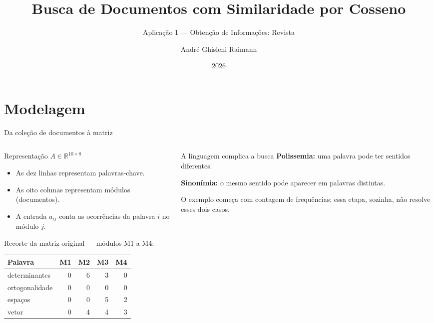 \documentclass{beamer}
\title[Busca por Cosseno]{Busca de Documentos com Similaridade por Cosseno}
\subtitle{Aplicação 1 — Obtenção de Informações: Revista}
\author[André Ghisleni Raimann]{André Ghisleni Raimann}
\institute[Álgebra Linear]{Álgebra Linear}
\date{2026}
\begin{document}
\begin{frame}
  \titlepage
\end{frame}

\section{Modelagem}

\begin{frame}{Da coleção de documentos à matriz}
  \begin{columns}[T]
    \begin{column}{0.55\textwidth}
      \begin{block}{Representação}
        \centering
        $A\in\mathbb{R}^{10\times 8}$
      \end{block}
      \begin{itemize}
        \item As dez linhas representam palavras-chave.
        \item As oito colunas representam módulos (documentos).
        \item A entrada $a_{ij}$ conta as ocorrências da palavra $i$ no módulo $j$.
      \end{itemize}
      \vspace{0.1cm}
      \small Recorte da matriz original — módulos M1 a M4:
      \begin{center}
        \scriptsize
        \begin{tabular}{lrrrr}
          \toprule
          Palavra & M1 & M2 & M3 & M4 \\
          \midrule
          determinantes & 0 & 6 & 3 & 0 \\
          ortogonalidade & 0 & 0 & 0 & 0 \\
          espaços & 0 & 0 & 5 & 2 \\
          vetor & 0 & 4 & 4 & 3 \\
          \bottomrule
        \end{tabular}
      \end{center}
    \end{column}
    \begin{column}{0.41\textwidth}
      \begin{alertblock}{A linguagem complica a busca}
        \textbf{Polissemia:} uma palavra pode ter sentidos diferentes.\par\medskip
        \textbf{Sinonímia:} o mesmo sentido pode aparecer em palavras distintas.
      \end{alertblock}
      O exemplo começa com contagem de frequências; essa etapa, sozinha, não resolve esses dois casos.
    \end{column}
  \end{columns}
\end{frame}
\end{document}
